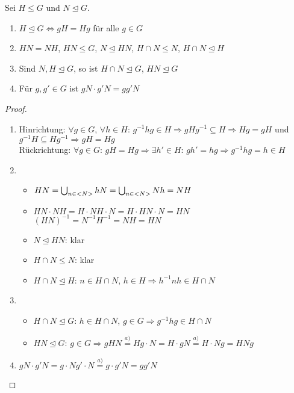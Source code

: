 \begin{lemma}
	Sei $H\le G$ und $N\unlhd G$.
	\begin{enumerate}[label=(\alph*)]
		\item $H\unlhd G\Leftrightarrow gH=Hg$ für alle $g\in G$
		\item $HN=NH$, $HN\le G$, $N\unlhd HN$, $H\cap N\le N$, $H\cap N\unlhd H$
		\item Sind $N,H\unlhd G$, so ist $H\cap N\unlhd G$, $HN\unlhd G$
		\item Für $g,g'\in G$ ist $gN\cdot g'N=gg'N$
	\end{enumerate}
\end{lemma}
\begin{proof}
	\begin{enumerate}[label=(\alph*)]
		\item Hinrichtung: $\forall g\in G$, $\forall h\in H$: $g^{-1}hg\in H\Rightarrow gHg^{-1}\subseteq H\Rightarrow Hg=gH$ und $g^{-1}H\subseteq Hg^{-1}\Rightarrow gH=Hg$ \\
		Rückrichtung: $\forall g\in G$: $gH=Hg \Rightarrow\exists h'\in H$: $gh'=hg\Rightarrow g^{-1}hg=h\in H$
		\item \begin{itemize}
			\item $HN=\bigcup_{n\in<N>} hN=\bigcup_{n\in<N>} Nh=NH$
			\item $HN\cdot NH=H\cdot NH\cdot N=H\cdot HN\cdot N=HN$ \\
			$(HN)^{-1}=N^{-1}H^{-1}=NH=HN$
			\item $N\unlhd HN$: klar
			\item $H\cap N\le N$: klar
			\item $H\cap N\unlhd H$: $n\in H\cap N$, $h\in H\Rightarrow h^{-1}nh\in H\cap N$
		\end{itemize}
		\item \begin{itemize}
			\item $H\cap N\unlhd G$: $h\in H\cap N$, $g\in G\Rightarrow g^{-1}hg\in H\cap N$
			\item $HN\unlhd G$: $g\in G\Rightarrow gHN\overset{a)}{=}Hg\cdot N=H\cdot gN\overset{a)}{=}H\cdot Ng=HNg$
		\end{itemize}
		\item $gN\cdot g'N=g\cdot Ng'\cdot N\overset{a)}{=}g\cdot g'N=gg'N$
	\end{enumerate}
\end{proof}

